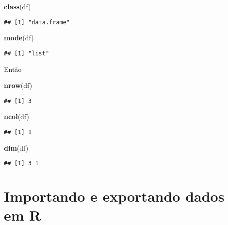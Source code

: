 \documentclass[]{book}
\newenvironment{Shaded}{\begin{snugshade}}{\end{snugshade}}
\newcommand{\KeywordTok}[1]{\textcolor[rgb]{0.13,0.29,0.53}{\textbf{#1}}}
\newcommand{\NormalTok}[1]{#1}
\theoremstyle{definition}
\theoremstyle{definition}
\theoremstyle{definition}
\theoremstyle{remark}
\begin{document}
\begin{Shaded}
\begin{Highlighting}[]
\KeywordTok{class}\NormalTok{(df)}
\end{Highlighting}
\end{Shaded}

\begin{verbatim}
## [1] "data.frame"
\end{verbatim}

\begin{Shaded}
\begin{Highlighting}[]
\KeywordTok{mode}\NormalTok{(df)}
\end{Highlighting}
\end{Shaded}

\begin{verbatim}
## [1] "list"
\end{verbatim}

Então

\begin{Shaded}
\begin{Highlighting}[]
\KeywordTok{nrow}\NormalTok{(df)}
\end{Highlighting}
\end{Shaded}

\begin{verbatim}
## [1] 3
\end{verbatim}

\begin{Shaded}
\begin{Highlighting}[]
\KeywordTok{ncol}\NormalTok{(df)}
\end{Highlighting}
\end{Shaded}

\begin{verbatim}
## [1] 1
\end{verbatim}

\begin{Shaded}
\begin{Highlighting}[]
\KeywordTok{dim}\NormalTok{(df)}
\end{Highlighting}
\end{Shaded}

\begin{verbatim}
## [1] 3 1
\end{verbatim}

\chapter{Importando e exportando dados em
R}\label{importando-e-exportando-dados-em-r}
\end{document}
